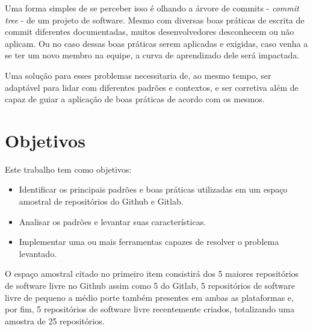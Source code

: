 Uma forma simples de se perceber isso é olhando a árvore de commits - \textit{commit tree} - de um projeto de software. Mesmo com diversas boas práticas de escrita de commit diferentes documentadas, muitos desenvolvedores desconhecem ou não aplicam. Ou no caso dessas boas práticas serem aplicadas e exigidas, caso venha a se ter um novo membro na equipe, a curva de aprendizado dele será impactada.

Uma solução para esses problemas necessitaria de, ao mesmo tempo, ser adaptável para lidar com diferentes padrões e contextos, e ser corretiva além de capaz de guiar a aplicação de boas práticas de acordo com os mesmos.









\section{Objetivos}
Este trabalho tem como objetivos:

\begin{itemize}
    \item Identificar os principais padrões e boas práticas utilizadas em um espaço amostral de repositórios do Github e Gitlab. 
    \item Analisar os padrões e levantar suas características.
    \item Implementar uma ou mais ferramentas capazes de resolver o problema levantado.
\end{itemize}

O espaço amostral citado no primeiro item consistirá dos 5 maiores repositórios de software livre no Github assim como 5 do Gitlab, 5 repositórios de software livre de pequeno a médio porte também presentes em ambas as plataformas e, por fim, 5 repositórios de software livre recentemente criados, totalizando uma amostra de 25 repositórios.

